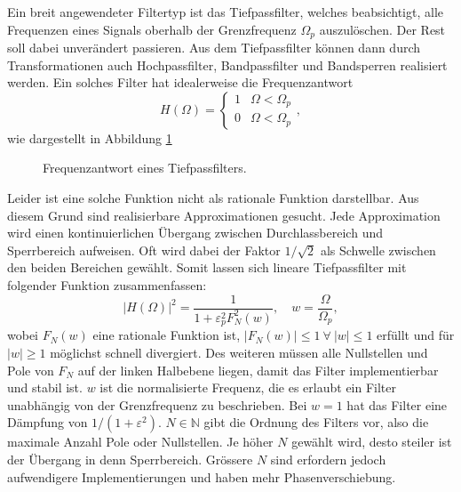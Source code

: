 Ein breit angewendeter Filtertyp ist das Tiefpassfilter, welches beabsichtigt, alle Frequenzen eines Signals oberhalb der Grenzfrequenz $\Omega_p$ auszulöschen.
Der Rest soll dabei unverändert passieren.
Aus dem Tiefpassfilter können dann durch Transformationen auch Hochpassfilter, Bandpassfilter und Bandsperren realisiert werden.
Ein solches Filter hat idealerweise die Frequenzantwort
\begin{equation}
    H(\Omega) =
    \begin{cases}
        1  & \Omega < \Omega_p \\
        0  & \Omega < \Omega_p
    \end{cases},
\end{equation}
wie dargestellt in Abbildung \ref{ellfilter:fig:lp}
\begin{figure}
    \centering
    
    \caption{Frequenzantwort eines Tiefpassfilters.}
    \label{ellfilter:fig:lp}
\end{figure}
Leider ist eine solche Funktion nicht als rationale Funktion darstellbar.
Aus diesem Grund sind realisierbare Approximationen gesucht.
Jede Approximation wird einen kontinuierlichen Übergang zwischen Durchlassbereich und Sperrbereich aufweisen.
Oft wird dabei der Faktor $1/\sqrt{2}$ als Schwelle zwischen den beiden Bereichen gewählt.
Somit lassen sich lineare Tiefpassfilter mit folgender Funktion zusammenfassen:
\begin{equation} \label{ellfilter:eq:quadratic_transfer}
    | H(\Omega)|^2 = \frac{1}{1 + \varepsilon_p^2 F_N^2(w)}, \quad w=\frac{\Omega}{\Omega_p},
\end{equation}
wobei $F_N(w)$ eine rationale Funktion ist, $|F_N(w)| \leq 1 ~\forall~ |w| \leq 1$ erfüllt und für $|w| \geq 1$ möglichst schnell divergiert.
Des weiteren müssen alle Nullstellen und Pole von $F_N$ auf der linken Halbebene liegen, damit das Filter implementierbar und stabil ist.
$w$ ist die normalisierte Frequenz, die es erlaubt ein Filter unabhängig von der Grenzfrequenz zu beschrieben.
Bei $w=1$ hat das Filter eine Dämpfung von $1/(1+\varepsilon^2)$.
$N \in \mathbb{N} $ gibt die Ordnung des Filters vor, also die maximale Anzahl Pole oder Nullstellen.
Je höher $N$ gewählt wird, desto steiler ist der Übergang in denn Sperrbereich.
Grössere $N$ sind erfordern jedoch aufwendigere Implementierungen und haben mehr Phasenverschiebung.

